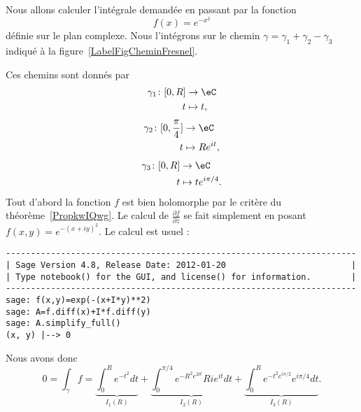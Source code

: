 Nous allons calculer l'intégrale demandée en passant par la fonction
\begin{equation}
	f(x)= e^{-x^2}
\end{equation}
définie sur le plan complexe. Nous l'intégrons sur le chemin \( \gamma=\gamma_1+\gamma_2-\gamma_3\) indiqué à la figure~\ref{LabelFigCheminFresnel}.
\newcommand{\CaptionFigCheminFresnel}{Chemin d'intégration pour l'intégrale de Fresnel}

Ces chemins sont donnés par
\begin{equation}
	\begin{aligned}
		\gamma_1\colon \mathopen[ 0 , R \mathclose] & \to \eC    \\
		t                                           & \mapsto t,
	\end{aligned}
\end{equation}
\begin{equation}
	\begin{aligned}
		\gamma_2\colon \mathopen[ 0 , \frac{ \pi }{ 4 } \mathclose] & \to \eC           \\
		t                                                           & \mapsto R e^{it},
	\end{aligned}
\end{equation}
\begin{equation}
	\begin{aligned}
		\gamma_3\colon \mathopen[ 0 , R \mathclose] & \to \eC               \\
		t                                           & \mapsto t e^{i\pi/4}.
	\end{aligned}
\end{equation}
Tout d'abord la fonction \( f\) est bien holomorphe par le critère du théorème~\ref{PropkwIQwg}. Le calcul de \( \frac{ \partial f }{ \partial \bar z }\) se fait simplement en posant \( f(x,y)= e^{-(x+iy)^2}\). Le calcul est usuel :
\begin{verbatim}
----------------------------------------------------------------------
| Sage Version 4.8, Release Date: 2012-01-20                         |
| Type notebook() for the GUI, and license() for information.        |
----------------------------------------------------------------------
sage: f(x,y)=exp(-(x+I*y)**2)
sage: A=f.diff(x)+I*f.diff(y)
sage: A.simplify_full()
(x, y) |--> 0
\end{verbatim}
Nous avons donc
\begin{equation}    \label{EqfaoRgU}
	0=\int_{\gamma}f=\underbrace{\int_0^R e^{-t^2}dt}_{I_1(R)}+\underbrace{\int_0^{\pi/4} e^{-R^2 e^{2it}}Ri e^{it}dt}_{I_2(R)}+\underbrace{\int_0^R e^{-t^2 e^{i\pi/2}} e^{i\pi/4}dt}_{I_3(R)}.
\end{equation}
